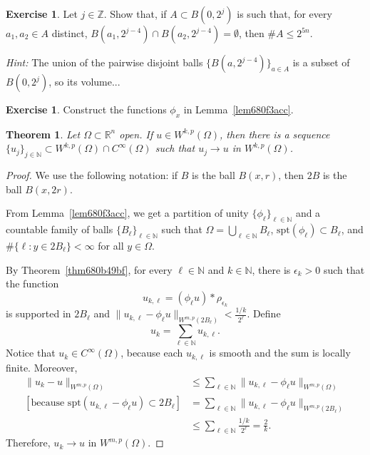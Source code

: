 \documentclass[a4paper,9pt]{amsart}
\newcommand{\N}{\mathbb{N}}	%
\newcommand{\Z}{\mathbb{Z}}	%
\newcommand{\R}{\mathbb{R}}	%
\newcommand{\spt}{\mathrm{spt}}
\theoremstyle{plain}
\newtheorem{theorem}[proposition]{Theorem}
\theoremstyle{definition}
\newtheorem{exercise}[proposition]{Exercise}%
\theoremstyle{remark}
\begin{document}
\begin{exercise}\label{ex680f2822}
	Let $j\in\Z$.
	Show that, if $A\subset B(0,2^j)$ is such that, for every $a_1,a_2\in A$ distinct, $B(a_1,2^{j-4})\cap B(a_2,2^{j-4}) = \emptyset$, then $\#A \le 2^{5n}$.
	
	{\it Hint:}
	The union of the pairwise disjoint balls $\{B(a,2^{j-4})\}_{a\in A}$ is a subset of $B(0,2^j)$, so its volume...
\end{exercise}

\begin{exercise}
	Construct the functions $\phi_x$ in Lemma~\ref{lem680f3acc}.
\end{exercise}

\begin{theorem}\label{thm6810811d}
	Let $\Omega\subset\R^n$ open.
	If $u\in W^{k,p}(\Omega)$, then there is a sequence $\{u_j\}_{j\in\N}\subset W^{k,p}(\Omega)\cap C^\infty(\Omega)$ such that $u_j\to u$ in $W^{k,p}(\Omega)$.
\end{theorem} 
\begin{proof}
	We use the following notation: if $B$ is the ball $B(x,r)$, then $2B$ is the ball $B(x,2r)$.
	
	From Lemma~\ref{lem680f3acc}, we get a partition of unity $\{\phi_\ell\}_{\ell\in\N}$
	and a countable family of balls $\{B_\ell\}_{\ell\in\N}$ 
	such that $\Omega = \bigcup_{\ell\in\N} B_\ell$, 
	$\spt(\phi_\ell)\subset B_\ell$,
	and $\#\{\ell:y\in 2B_\ell\}<\infty$ for all $y\in\Omega$.
	
	By Theorem~\ref{thm680b49bf},
	for every $\ell\in\N$ and $k\in\N$, there is $\epsilon_k>0$ such that the function
	\begin{equation}
		u_{k,\ell} = (\phi_\ell u)*\rho_{\epsilon_k} 
	\end{equation}
	is supported in $2B_\ell$ and $\|u_{k,\ell} - \phi_\ell u\|_{W^{m,p}(2B_\ell)} < \frac{1/k}{2^\ell}$.
	Define
	\begin{equation}
		u_k = \sum_{\ell\in\N} u_{k,\ell} .
	\end{equation}
	Notice that $u_k\in C^\infty(\Omega)$, because each $u_{k,\ell}$ is smooth and the sum is locally finite.
	Moreover,
	\begin{align*}
	 	\|u_k-u\|_{W^{m,p}(\Omega)}
		&\le \sum_{\ell\in\N} \| u_{k,\ell} - \phi_\ell u\|_{W^{m,p}(\Omega)} \\
		[\text{because }\spt(u_{k,\ell} - \phi_\ell u)\subset 2B_\ell]
		&= \sum_{\ell\in\N} \| u_{k,\ell} - \phi_\ell u\|_{W^{m,p}(2B_\ell)} \\
		&\le \sum_{\ell\in\N} \frac{1/k}{2^\ell} 
		= \frac{2}{k} .
	\end{align*}
	Therefore, $u_k\to u$ in $W^{m,p}(\Omega)$.
\end{proof}
\end{document}
